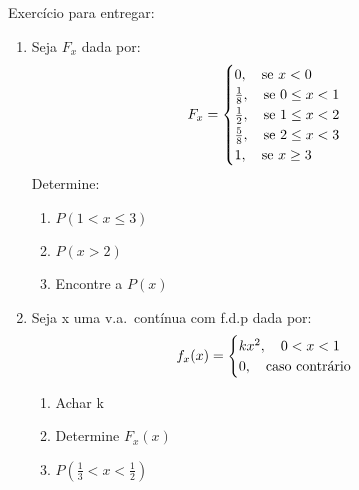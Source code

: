\documentclass[11pt,a4paper]{book}
\begin{document}
\begin{enumerate}[label=(\alph*)]
\begin{enumerate}
Exercício para entregar: 
\begin{enumerate}
  \item  Seja $F_{x}$ dada por:
    \begin{align*}
      F_{x}=\begin{cases} 
        0, \text{\quad se }x<0 \\
        \frac{1}{8},\text{\quad se }0 \le x <1 \\
        \frac{1}{2}, \text{\quad se }1 \le x < 2 \\
        \frac{5}{8}, \text{\quad se }2 \le x < 3 \\
        1,\text{\quad se } x \geq 3
      \end{cases}
    \end{align*}
    Determine: 
    \begin{enumerate}[label=(\alph*)]
      \item $P(1 < x \le 3)$
      \item $P(x>2)$
      \item Encontre a $P(x)$
    \end{enumerate}
  \item  Seja x uma v.a.\ contínua com f.d.p dada por: 
    \begin{align*}
      f_{x}(x)= 
      \begin{cases}
        kx^2,\text{\quad} 0<x<1\\
        0, \text{\quad caso contrário}
      \end{cases}
    \end{align*}
    \begin{enumerate}[label=(\alph*)]
      \item Achar k
      \item Determine $F_{x}(x)$
      \item $P(\frac{1}{3} < x < \frac{1}{2})$
    \end{enumerate}

\end{enumerate}

\end{enumerate}
\end{enumerate}
\end{document}
